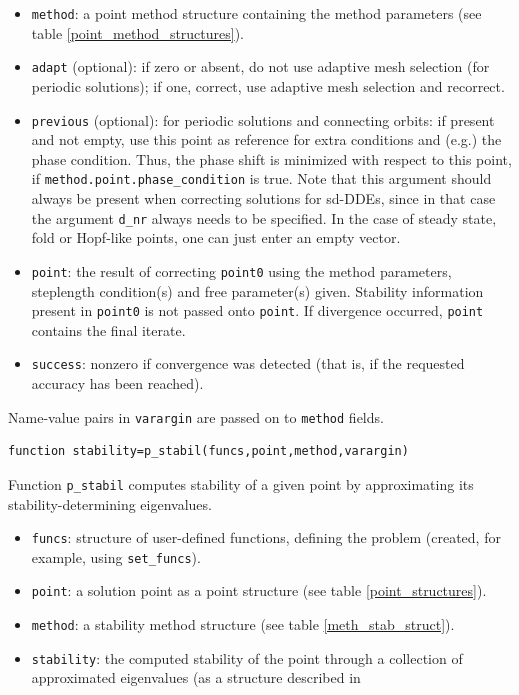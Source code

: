 \documentclass[10pt]{scrartcl}
\newcommand{\blist}[1]{\mbox{\lstinline!#1!}}
\begin{document}
{\begin{itemize}
  is zero. Similar formulas hold for the other solution types.
\item \blist{method}: a point method structure containing the method
  parameters (see table \ref{point_method_structures}).
\item \blist{adapt} (optional): if zero or absent, do not use adaptive
  mesh selection (for periodic solutions); if one, correct, use
  adaptive mesh selection and recorrect.
\item \blist{previous} (optional): for periodic solutions and
  connecting orbits: if present and not empty, use this point as
  reference for extra conditions and (e.g.) the phase condition. Thus,
  the phase shift is minimized with respect to this point, if
  \blist{method.point.phase_condition} is true. Note that this argument should
  always be present when correcting solutions for sd-DDEs, since in
  that case the argument \blist{d_nr} always needs to be specified.
  In the case of steady state, fold or Hopf-like points, one can just
  enter an empty vector.
\item \blist{point}: the result of correcting \blist{point0} using the
  method parameters, steplength condition(s) and free parameter(s)
  given. Stability information present in \blist{point0} is not passed
  onto \blist{point}.  If divergence occurred, \blist{point} contains
  the final iterate.
\item \blist{success}: nonzero if convergence was detected (that is,
  if the requested accuracy has been reached).
\end{itemize}
Name-value pairs in \blist{varargin} are passed on to \blist{method} fields.
\begin{lstlisting}
function stability=p_stabil(funcs,point,method,varargin)  
\end{lstlisting}
\noindent Function \blist{p_stabil} computes stability of a given
point by approximating its stability-determining eigenvalues.
\begin{itemize}
\item \blist{funcs}: structure of user-defined functions, defining the
  problem (created, for example, using \blist{set_funcs}).
\item \blist{point}: a solution point as a point structure (see table
  \ref{point_structures}).
\item \blist{method}: a stability method structure (see table
  \ref{meth_stab_struct}).
\item \blist{stability}: the computed stability of the point through a
  collection of approximated eigenvalues (as a structure described in

\end{itemize}}
\end{document}
